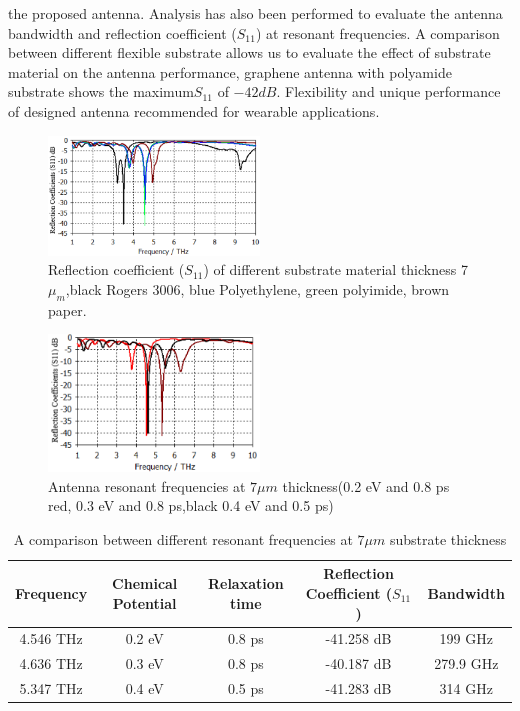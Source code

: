 \documentclass[12pt]{suhbook}
\begin{document}
the proposed antenna. Analysis has also been performed to evaluate the antenna bandwidth and reflection coefficient ($S_{11}$) at resonant frequencies. A comparison between different flexible substrate allows us to evaluate the effect of substrate material on the antenna performance, graphene antenna with polyamide substrate shows the maximum$S_{11}$ of $-42 dB$. Flexibility and unique performance of designed antenna recommended for wearable applications.
\begin{figure}[hbt!]
\centering
\includegraphics[width=0.5\textwidth]{4}
\caption{Reflection coefficient ($S_{11}$) of different substrate material thickness 7 $\mu_m $,black Rogers 3006, blue Polyethylene, green polyimide, brown paper.}
\label{Fig 4}
\end{figure}
\begin{figure}[h]
\centering
\includegraphics[width=0.5\textwidth]{5}
\caption{Antenna resonant frequencies at $7\mu m$ thickness(0.2 eV and 0.8 ps red, 0.3 eV and 0.8 ps,black 0.4 eV and 0.5 ps)}
\label{Fig 5}
\end{figure}
\begin{table}[hbt!]
\centering
\begin{tabular}{||c c c c c||}
\hline
Frequency & Chemical Potential & Relaxation time & Reflection Coefficient ($S_{11}$) & Bandwidth \\[0.5ex] 
\hline\hline
4.546 THz & 0.2 eV & 0.8 ps &-41.258 dB & 199 GHz \\ 
\hline
4.636 THz & 0.3 eV & 0.8 ps & -40.187 dB& 279.9 GHz \\
\hline
5.347 THz & 0.4 eV & 0.5 ps & -41.283 dB& 314 GHz \\[1ex] 
\hline
\end{tabular}
\caption{A comparison between different resonant frequencies at $7\mu m$ substrate thickness }
\label{table:3}
\end{table}
\end{document}
